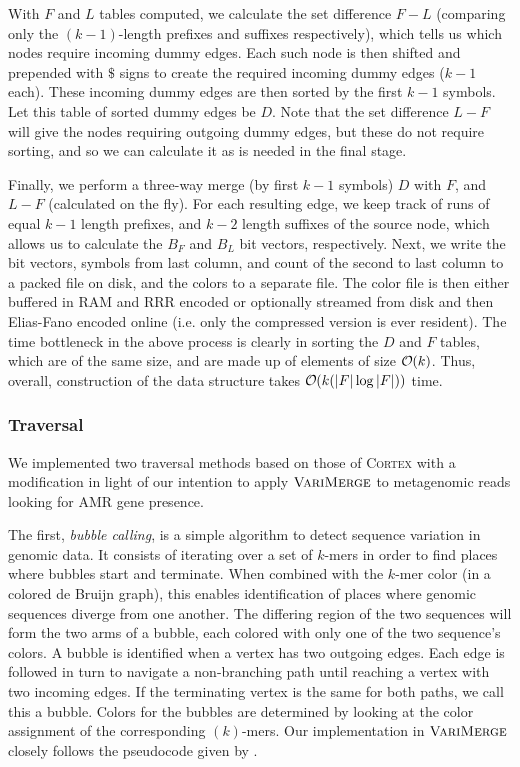 With $F$ and $L$ tables computed, we calculate the set difference $F-L$ (comparing only the $(k-1)$-length prefixes and suffixes respectively), which tells us which nodes require incoming dummy edges. Each such node is then
shifted and prepended with $\$$ signs to create the required incoming dummy edges ($k-1$ each). These incoming dummy edges are then sorted by the first $k-1$ symbols.
Let this table of sorted dummy edges be $D$. Note that the set difference $L - F$ will give the nodes requiring outgoing dummy edges, but these do not require sorting, and so we can calculate it as is needed in the final stage.

Finally, we perform a three-way merge (by first $k-1$ symbols) $D$ with $F$, and $L-F$ (calculated on the fly). For each resulting edge, we keep track of runs of equal $k-1$ length prefixes,
and $k-2$ length suffixes of the source node, which allows us to calculate the $B_F$ and $B_L$ bit vectors, respectively. Next, we write the bit vectors, symbols from last column, and
count of the second to last column to a packed file on disk, and the colors to a separate file.   The color file is then either buffered in RAM and RRR encoded or optionally streamed from disk and then Elias-Fano encoded online (i.e. only the compressed version is ever resident).  The time bottleneck in the above process is clearly in sorting the $D$ and $F$ tables, which are of the same size, and are made up of elements of size $\bigO(k)$. Thus, overall, construction of the data structure takes $\bigO(k(|F|\log|F|))$ time.





\subsubsection{Traversal}
We implemented two traversal methods based on those of \textsc{Cortex} with a modification in light of our intention to apply $\mbox{\rm {\sc VariMerge}}$ to metagenomic reads looking for AMR gene presence.

The first, \emph{bubble calling}, is a simple algorithm to detect sequence variation in genomic data. It consists of iterating over a set of $k$-mers in order to find places where bubbles start and terminate.  When combined with the $k$-mer color (in a colored de Bruijn graph), this enables identification of places where genomic sequences diverge from one another.  The differing region of the two sequences will form the two arms of a bubble, each colored with only one of the two sequence's colors.  A bubble is identified when a vertex has two outgoing edges. Each edge is followed in turn to navigate a non-branching path until reaching a vertex with two incoming edges. If the terminating vertex is the same for both paths, we call this a bubble. Colors for the bubbles are determined by looking at the color assignment of the corresponding $(k)$-mers. Our implementation in $\mbox{\rm {\sc VariMerge}}$ closely follows the pseudocode given by \cite{ICTFM12}.


